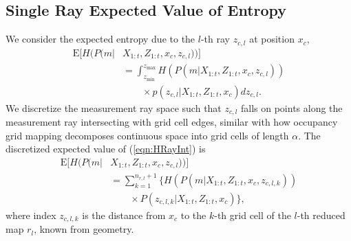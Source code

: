 \documentclass[letterpaper, 10pt, conference]{ieeeconf}
\newcommand{\refeqn}[1]{(\ref{eqn:#1})}
\begin{document}
\subsection{Single Ray Expected Value of Entropy}
We consider the expected entropy due to the $l$-th ray $z_{c,l}$ at position $x_c$,
\begin{align}
\label{eqn:HRayInt}
\text{E}[H(P(m|&X_{1:t},Z_{1:t},x_c,z_{c,l}))]
\nonumber\\&
=\int_{z_\text{min}}^{z_\text{max}}
H(P(m|X_{1:t},Z_{1:t},x_c,z_{c,l}))\nonumber\\&\qquad\times p(z_{c,l}|X_{1:t},Z_{1:t},x_c)
dz_{c,l}.
\end{align}
We discretize the measurement ray space such that $z_{c,l}$ falls on points along the measurement ray intersecting with grid cell edges, similar with how occupancy grid mapping decomposes continuous space into grid cells of length $\alpha$.
The discretized expected value of \refeqn{HRayInt} is
\begin{align}
\label{eqn:DiscExpEntropyRay}
\text{E}[H(P(m|&X_{1:t},Z_{1:t},x_c,z_{c,l}))]
\nonumber\\&=\sum_{k=1}^{n_{r,l}+1}\bigg\{H(P(m|X_{1:t},Z_{1:t},x_c,z_{c,l,k}))\nonumber\\&\qquad\times P(z_{c,l,k}|X_{1:t},Z_{1:t},x_c)\bigg\},
\end{align}
where index $z_{c,l,k}$ is the distance from $x_c$ to the $k$-th grid cell of the $l$-th reduced map $r_l$, known from geometry.
\end{document}
